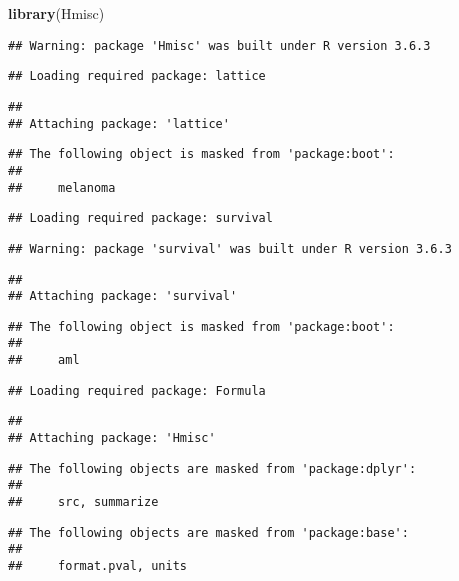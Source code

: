 \documentclass[
]{article}
\newenvironment{Shaded}{\begin{snugshade}}{\end{snugshade}}
\newcommand{\KeywordTok}[1]{\textcolor[rgb]{0.13,0.29,0.53}{\textbf{#1}}}
\newcommand{\NormalTok}[1]{#1}
\begin{document}
\begin{Shaded}
\begin{Highlighting}[]
\KeywordTok{library}\NormalTok{(Hmisc)}
\end{Highlighting}
\end{Shaded}

\begin{verbatim}
## Warning: package 'Hmisc' was built under R version 3.6.3
\end{verbatim}

\begin{verbatim}
## Loading required package: lattice
\end{verbatim}

\begin{verbatim}
## 
## Attaching package: 'lattice'
\end{verbatim}

\begin{verbatim}
## The following object is masked from 'package:boot':
## 
##     melanoma
\end{verbatim}

\begin{verbatim}
## Loading required package: survival
\end{verbatim}

\begin{verbatim}
## Warning: package 'survival' was built under R version 3.6.3
\end{verbatim}

\begin{verbatim}
## 
## Attaching package: 'survival'
\end{verbatim}

\begin{verbatim}
## The following object is masked from 'package:boot':
## 
##     aml
\end{verbatim}

\begin{verbatim}
## Loading required package: Formula
\end{verbatim}

\begin{verbatim}
## 
## Attaching package: 'Hmisc'
\end{verbatim}

\begin{verbatim}
## The following objects are masked from 'package:dplyr':
## 
##     src, summarize
\end{verbatim}

\begin{verbatim}
## The following objects are masked from 'package:base':
## 
##     format.pval, units
\end{verbatim}
\end{document}

